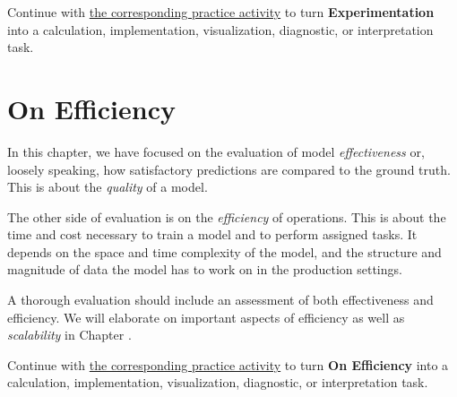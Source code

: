 \documentclass[
  letterpaper,
]{scrbook}
\begin{document}
\begin{tcolorbox}[enhanced jigsaw, arc=.35mm, bottomrule=.15mm, bottomtitle=1mm, breakable, colback=white, colbacktitle=quarto-callout-tip-color!10!white, colframe=quarto-callout-tip-color-frame, coltitle=black, left=2mm, leftrule=.75mm, opacityback=0, opacitybacktitle=0.6, rightrule=.15mm, title=\textcolor{quarto-callout-tip-color}{\faLightbulb}\hspace{0.5em}{Put it into practice}, titlerule=0mm, toprule=.15mm, toptitle=1mm]

Continue with \hyperref[sec-pr-14-experimentation]{the corresponding
practice activity} to turn \textbf{Experimentation} into a calculation,
implementation, visualization, diagnostic, or interpretation task.

\end{tcolorbox}

\section{On Efficiency}\label{on-efficiency}

In this chapter, we have focused on the evaluation of model
\emph{effectiveness} or, loosely speaking, how satisfactory predictions
are compared to the ground truth. This is about the \emph{quality} of a
model.

The other side of evaluation is on the \emph{efficiency} of operations.
This is about the time and cost necessary to train a model and to
perform assigned tasks. It depends on the space and time complexity of
the model, and the structure and magnitude of data the model has to work
on in the production settings.

A thorough evaluation should include an assessment of both effectiveness
and efficiency. We will elaborate on important aspects of efficiency as
well as \emph{scalability} in Chapter .

\begin{tcolorbox}[enhanced jigsaw, arc=.35mm, bottomrule=.15mm, bottomtitle=1mm, breakable, colback=white, colbacktitle=quarto-callout-tip-color!10!white, colframe=quarto-callout-tip-color-frame, coltitle=black, left=2mm, leftrule=.75mm, opacityback=0, opacitybacktitle=0.6, rightrule=.15mm, title=\textcolor{quarto-callout-tip-color}{\faLightbulb}\hspace{0.5em}{Put it into practice}, titlerule=0mm, toprule=.15mm, toptitle=1mm]

Continue with \hyperref[sec-pr-14-on-efficiency]{the corresponding
practice activity} to turn \textbf{On Efficiency} into a calculation,
implementation, visualization, diagnostic, or interpretation task.

\end{tcolorbox}
\end{document}
